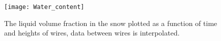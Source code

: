 \begin{figure}[h!]
	\centering
	\texttt{[image: Water\_content]}
	\caption{The liquid volume fraction in the snow plotted as a function of time
    and heights of wires, data between wires is interpolated.}
	\label{liquidfractionsnow}
\end{figure}





